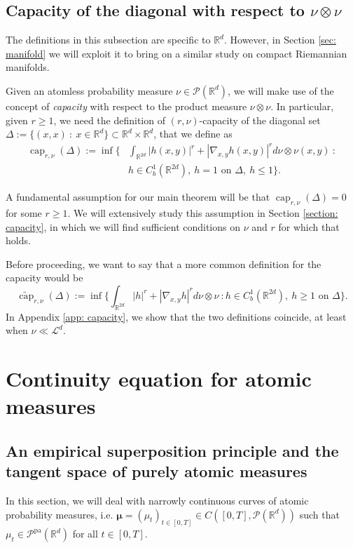 \documentclass[10pt,leqno]{amsart}
\numberwithin{equation}{section}
\newcommand{\R}{\mathbb{R}}
\newcommand{\PP}{\mathcal{P}}
\newcommand{\PPpa}{\PP^{\operatorname{pa}}}
\begin{document}
\subsection{Capacity of the diagonal with respect to \texorpdfstring{$\nu\otimes\nu$}{}}\label{subsec: capacity}
The definitions in this subsection are specific to $\R^d$. However, in Section \ref{sec: manifold} we will exploit it to bring on a similar study on compact Riemannian manifolds.

Given an atomless probability measure $\nu\in \PP(\R^d)$, we will make use of the concept of \textit{capacity} with respect to the product measure $\nu\otimes \nu$. In particular, given $r\geq 1$, we need the definition of $(r,\nu)$-capacity of the diagonal set $\Delta:= \{(x,x) \ : \ x\in \R^d\} \subset \R^d \times \R^d$, that we define as
    \begin{equation}\label{capacity definition}
    \begin{aligned}
         \operatorname{cap}_{r,\nu}(\Delta) :=\inf \bigg\{ & \int_{\R^{2d}} |h(x,y)|^r +  |\nabla_{x,y} h(x,y)|^r d\nu\otimes\nu(x,y) \ : \\
         & h\in C^{1}_b(\R^{2d}), \ h= 1 \text{ on }\Delta, \  h \leq 1 \bigg\}.
    \end{aligned}
    \end{equation}

A fundamental assumption for our main theorem will be that $\operatorname{cap}_{r,\nu} (\Delta)= 0$ for some $r\geq 1$. We will extensively study this assumption in Section \ref{section: capacity}, in which we will find sufficient conditions on $\nu$ and $r$ for which that holds.

Before proceeding, we want to say that a more common definition for the capacity would be 
\begin{equation}
\widetilde{\operatorname{cap}}_{r,\nu} (\Delta) :=\inf \bigg\{  \int_{\R^{2d}} |h|^r +  |\nabla_{x,y} h|^r d\nu\otimes\nu \ : h\in C^{1}_b(\R^{2d}), \ h\geq 1 \text{ on }\Delta \bigg\}.
\end{equation}
In Appendix \ref{app: capacity}, we show that the two definitions coincide, at least when $\nu\ll \mathcal{L}^d$.





\section{Continuity equation for atomic measures}\label{section: counterexample}
\subsection{An empirical superposition principle and the tangent space of purely atomic measures}
In this section, we will deal with narrowly continuous curves of atomic probability measures, i.e. $\boldsymbol{\mu} = (\mu_t)_{t\in[0,T]} \in C([0,T],\PP(\R^d))$ such that $\mu_t \in \PPpa(\R^d)$ for all $t\in[0,T]$.  
\end{document}
